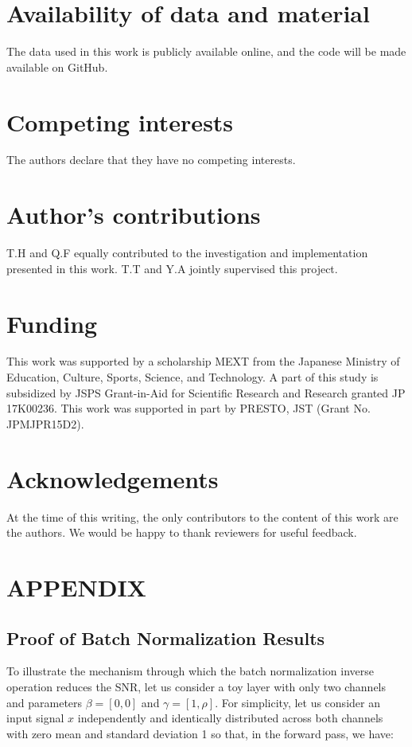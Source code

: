 \documentclass[twocolumn]{bmcart}
\begin{document}
\begin{backmatter}
\section*{Availability of data and material}
The data used in this work is publicly available online, and the code will be made available on GitHub.

\section*{Competing interests}
The authors declare that they have no competing interests.

\section*{Author's contributions}
T.H and Q.F equally contributed to the investigation and implementation presented in this work. T.T and Y.A jointly supervised this project.

\section*{Funding}
This work was supported by a scholarship MEXT from the Japanese Ministry of Education, Culture, Sports, Science, and Technology.
A part of this study is subsidized by JSPS Grant-in-Aid for Scientific Research and Research granted JP 17K00236.
This work was supported in part by PRESTO, JST (Grant No. JPMJPR15D2).

\section*{Acknowledgements}
At the time of this writing, the only contributors to the content of this work are the authors.
We would be happy to thank reviewers for useful feedback.




\section*{APPENDIX}
\subsection*{Proof of Batch Normalization Results}

To illustrate the mechanism through which the batch normalization inverse operation reduces the SNR,
let us consider a toy layer with only two channels and parameters $\beta=[0,0]$ and $\gamma = [1, \rho]$.
For simplicity, let us consider an input signal $x$ independently and identically distributed across both channels
with zero mean and standard deviation 1 so that, in the forward pass, we have:


\end{backmatter}
\end{document}
